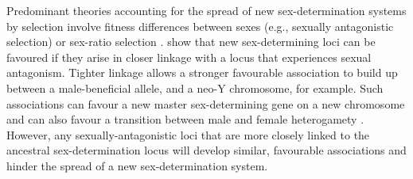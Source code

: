 \documentclass[12pt]{article}
\begin{document}


Predominant theories accounting for the spread of new sex-determination systems by selection involve fitness differences between sexes (e.g., sexually antagonistic selection) or sex-ratio selection \citep{Blaser2012, Beukeboom:2014vb,vanDoorn2014re}. 
\citet{vanDoorn:2007eu,vanDoorn:2010hu} show that new sex-determining loci can be favoured if they arise in closer linkage with a locus that experiences sexual antagonism. 
Tighter linkage allows a stronger favourable association to build up between a male-beneficial allele, and a neo-Y chromosome, for example. 
Such associations can favour a new master sex-determining gene on a new chromosome \citep{vanDoorn:2007eu} and can also favour a transition between male and female heterogamety \citep[e.g., a ZW to XY transition,][]{vanDoorn:2010hu}. 
However, any sexually-antagonistic loci that are more closely linked to the ancestral sex-determination locus will develop similar, favourable associations and hinder the spread of a new sex-determination system. 
\end{document}
